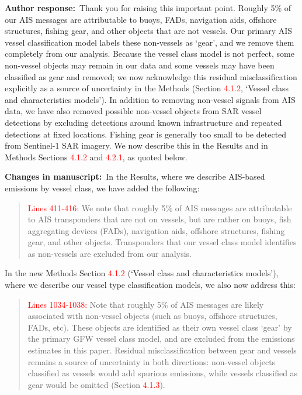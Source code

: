 \documentclass[11pt]{article}
\newcommand{\response}{\par\medskip\noindent%
  \textbf{\textcolor{respblue}{Author response:}}\ }
\newcommand{\changes}{\par\medskip\noindent%
  \textbf{\textcolor{changegreen}{Changes in manuscript:}}\ }
\begin{document}
\response Thank you for raising this important point. Roughly 5\% of our AIS messages are attributable to buoys, FADs, navigation aids, offshore structures, fishing gear, and other objects that are not vessels. Our primary AIS vessel classification model labels these non-vessels as `gear', and we remove them completely from our analysis. Because the vessel class model is not perfect, some non-vessel objects may remain in our data and some vessels may have been classified as gear and removed; we now acknowledge this residual misclassification explicitly as a source of uncertainty in the Methods (Section \textcolor{red}{4.1.2}, `Vessel class and characteristics models'). In addition to removing non-vessel signals from AIS data, we have also removed possible non-vessel objects from SAR vessel detections by excluding detections around known infrastructure and repeated detections at fixed locations. Fishing gear is generally too small to be detected from Sentinel-1 SAR imagery. We now describe this in the Results and in Methods Sections \textcolor{red}{4.1.2} and \textcolor{red}{4.2.1}, as quoted below.

\changes In the Results, where we describe AIS-based emissions by vessel class, we have added the following:

\begin{quote}
\textcolor{red}{Lines 411-416:}
We note that roughly 5\% of AIS messages are attributable to AIS transponders that are not on vessels, but are rather on buoys, fish aggregating devices (FADs), navigation aids, offshore structures, fishing gear, and other objects. Transponders that our vessel class model identifies as non-vessels are excluded from our analysis.
\end{quote}

In the new Methods Section \textcolor{red}{4.1.2} (`Vessel class and characteristics models'), where we describe our vessel type classification models, we also now address this:

\begin{quote}
\textcolor{red}{Lines 1034-1038:}
Note that roughly 5\% of AIS messages are likely associated with non-vessel objects (such as buoys, offshore structures, FADs, etc). These objects are identified as their own vessel class `gear' by the primary GFW vessel class model, and are excluded from the emissions estimates in this paper. Residual misclassification between gear and vessels remains a source of uncertainty in both directions: non-vessel objects classified as vessels would add spurious emissions, while vessels classified as gear would be omitted (Section \textcolor{red}{4.1.3}).
\end{quote}
\end{document}
